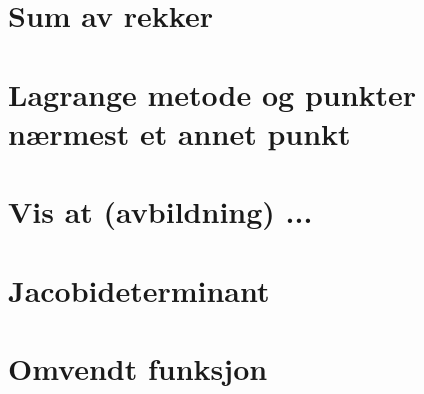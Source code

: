 \documentclass{article}
\begin{document}
  \section*{Sum av rekker}
    
  \section*{Lagrange metode og punkter nærmest et annet punkt}
    
  \section*{Vis at (avbildning) ...}
    
  \section*{Jacobideterminant}
    
  \section*{Omvendt funksjon}
    
\end{document}
